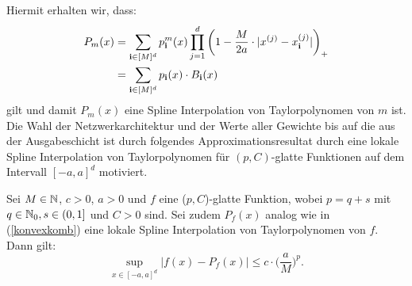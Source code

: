 Hiermit erhalten wir, dass:
\begin{equation*}
\begin{split}
P_m(x) &= \sum_{\mathbf{i} \in [M]^d} p_{\mathbf{i}}^m(x) \prod_{j = 1}^{d} \bigg(1 - \frac{M}{2a} \cdot |x^{(j)} - x_{\mathbf{i}}^{(j)}|\bigg)_+ \\
& = \sum_{\mathbf{i} \in [M]^d} p_{\mathbf{i}}(x) \cdot B_{\mathbf{i}}(x)
\end{split}
\end{equation*}
gilt und damit $P_m(x)$ eine Spline Interpolation von Taylorpolynomen von $m$ ist.
Die Wahl der Netzwerkarchitektur und der Werte aller Gewichte bis auf die aus der Ausgabeschicht ist durch folgendes Approximationsresultat durch eine lokale Spline Interpolation von Taylorpolynomen für $(p,C)$-glatte Funktionen auf dem Intervall $[-a, a]^d$ motiviert.
\begin{lem}
\label{lem:pcsmooth}
Sei $M \in \mathbb{N}$, $c > 0$, $a > 0$ und $f$ eine ($p, C$)-glatte Funktion, wobei $p = q + s$ mit $q \in \mathbb{N}_0, s \in (0,1]$ und $C > 0$ sind. Sei zudem $P_f(x)$ analog wie in (\ref{konvexkomb}) eine lokale Spline Interpolation von Taylorpolynomen von $f$. Dann gilt$\colon$
$$\sup_{x \in [-a, a]^d} |f(x) - P_f(x)|  \leq c \cdot \bigg(\frac{a}{M}\bigg)^p.$$
\end{lem}
